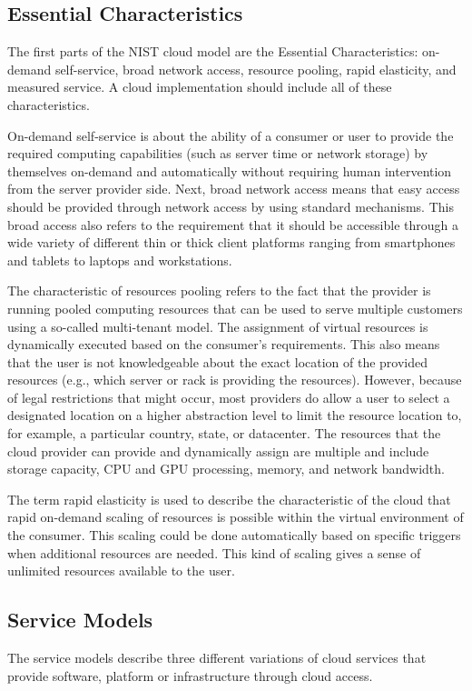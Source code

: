 \subsection{Essential Characteristics}
The first parts of the NIST cloud model are the Essential Characteristics: on-demand self-service, broad network access, resource pooling, rapid elasticity, and measured service. A cloud implementation should include all of these characteristics. 


On-demand self-service is about the ability of a consumer or user to provide the required computing capabilities (such as server time or network storage) by themselves on-demand and automatically without requiring human intervention from the server provider side. 
Next, broad network access means that easy access should be provided through network access by using standard mechanisms. This broad access also refers to the requirement that it should be accessible through a wide variety of different thin or thick client platforms ranging from smartphones and tablets to laptops and workstations.

The characteristic of resources pooling refers to the fact that the provider is running pooled computing resources that can be used to serve multiple customers using a so-called multi-tenant model. The assignment of virtual resources is dynamically executed based on the consumer's requirements. This also means that the user is not knowledgeable about the exact location of the provided resources (e.g., which server or rack is providing the resources). However, because of legal restrictions that might occur, most providers do allow a user to select a designated location on a higher abstraction level to limit the resource location to, for example, a particular country, state, or datacenter. The resources that the cloud provider can provide and dynamically assign are multiple and include storage capacity, CPU and GPU processing, memory, and network bandwidth. 


The term rapid elasticity is used to describe the characteristic of the cloud that rapid on-demand scaling of resources is possible within the virtual environment of the consumer. This scaling could be done automatically based on specific triggers when additional resources are needed. This kind of scaling gives a sense of unlimited resources available to the user. 




\subsection{Service Models}
The service models describe three different variations of cloud services that provide software, platform or infrastructure through cloud access.


